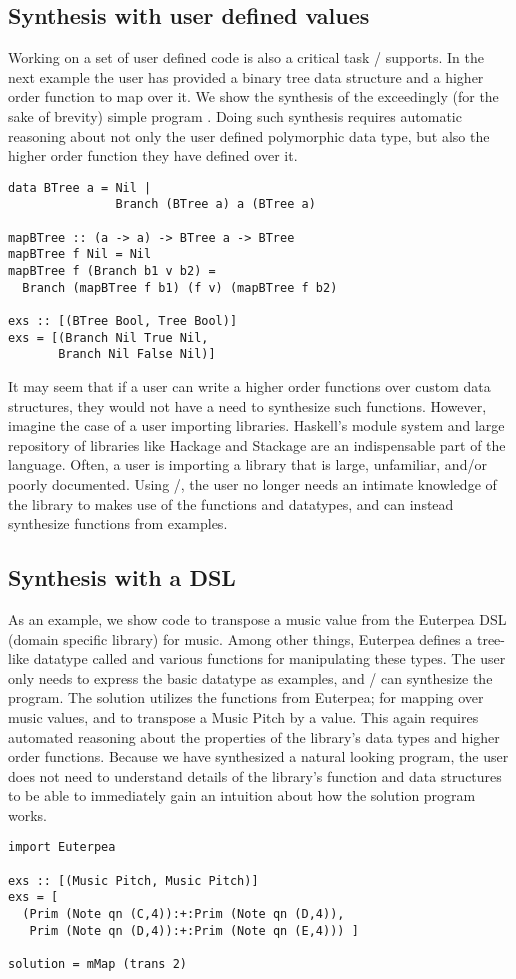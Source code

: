 \subsection{Synthesis with user defined values}

Working on a set of user defined code is also a critical task \ourTool/ supports. 
In the next example the user has provided a binary tree data structure and a higher order function to map over it. We show the synthesis of the exceedingly (for the sake of brevity) simple program .
Doing such synthesis requires automatic reasoning about not only the user defined polymorphic data type, but also the higher order function they have defined over it.

\begin{lstlisting}
data BTree a = Nil |
               Branch (BTree a) a (BTree a)

mapBTree :: (a -> a) -> BTree a -> BTree 
mapBTree f Nil = Nil
mapBTree f (Branch b1 v b2) = 
  Branch (mapBTree f b1) (f v) (mapBTree f b2)

exs :: [(BTree Bool, Tree Bool)]
exs = [(Branch Nil True Nil,
       Branch Nil False Nil)]
\end{lstlisting}

It may seem that if a user can write a higher order functions over custom data structures, they would not have a need to synthesize such functions.
However, imagine the case of a user importing libraries.
Haskell's module system and large repository of libraries like Hackage and Stackage are an indispensable part of the language\cite{hackage,stackage}.
Often, a user is importing a library that is large, unfamiliar, and/or poorly documented.
Using \ourTool/, the user no longer needs an intimate knowledge of the library to makes use of the functions and datatypes, and can instead synthesize functions from examples.


\subsection{Synthesis with a DSL}

As an example, we show code to transpose a music value from the Euterpea DSL (domain specific library) for music\cite{euterpea}.
Among other things, Euterpea defines a tree-like datatype called  and various functions for manipulating these types.
The user only needs to express the basic datatype as examples, and \ourTool/ can synthesize the  program.
The solution utilizes the functions from Euterpea;  for mapping over music values, and  to transpose a Music Pitch by a value.
This again requires automated reasoning about the properties of the library's data types and higher order functions.
Because we have synthesized a natural looking program, the user does not need to understand details of the library's function and data structures to be able to immediately gain an intuition about how the solution program works.

\begin{lstlisting}
import Euterpea

exs :: [(Music Pitch, Music Pitch)]
exs = [
  (Prim (Note qn (C,4)):+:Prim (Note qn (D,4)),
   Prim (Note qn (D,4)):+:Prim (Note qn (E,4))) ]
        
solution = mMap (trans 2)
\end{lstlisting}

